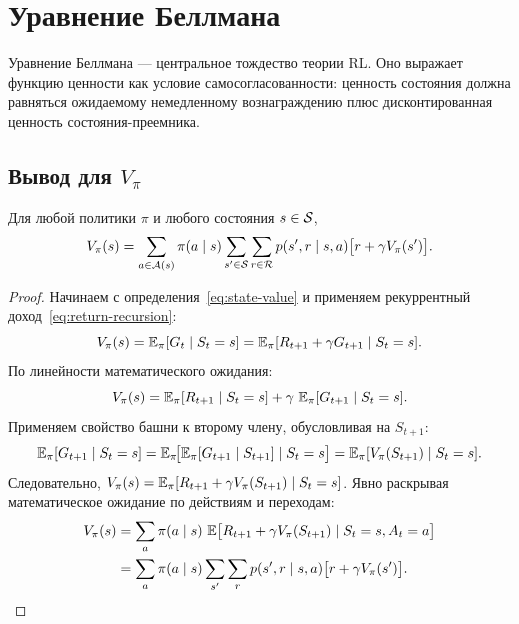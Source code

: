 \section{Уравнение Беллмана}
\label{sec:bellman-equation}

Уравнение Беллмана — центральное тождество теории RL. Оно выражает функцию ценности как условие самосогласованности: ценность состояния должна равняться ожидаемому немедленному вознаграждению плюс дисконтированная ценность состояния-преемника.

\subsection*{Вывод для $V_\pi$}

\begin{theorem}
\label{thm:bellman-v}
Для любой политики $\pi$ и любого состояния $s \in \mathcal{S}$,
\begin{equation}
\label{eq:bellman-v}
V_\pi(s)
= \sum_{a \in \mathcal{A}(s)} \pi(a \mid s)
  \sum_{s' \in \mathcal{S}} \sum_{r \in \mathcal{R}}
  p(s', r \mid s, a)\bigl[r + \gamma V_\pi(s')\bigr].
\end{equation}
\end{theorem}

\begin{proof}
Начинаем с определения~\eqref{eq:state-value} и применяем рекуррентный доход~\eqref{eq:return-recursion}:
\[
V_\pi(s)
= \operatorname{\mathbb{E}}_\pi[G_t \mid S_t = s]
= \operatorname{\mathbb{E}}_\pi[R_{t+1} + \gamma G_{t+1} \mid S_t = s].
\]
По линейности математического ожидания:
\[
V_\pi(s) = \operatorname{\mathbb{E}}_\pi[R_{t+1} \mid S_t = s]
           + \gamma\, \operatorname{\mathbb{E}}_\pi[G_{t+1} \mid S_t = s].
\]
Применяем свойство башни к второму члену, обусловливая на $S_{t+1}$:
\[
\operatorname{\mathbb{E}}_\pi[G_{t+1} \mid S_t = s]
= \operatorname{\mathbb{E}}_\pi\!\bigl[\operatorname{\mathbb{E}}_\pi[G_{t+1} \mid S_{t+1}] \mid S_t = s\bigr]
= \operatorname{\mathbb{E}}_\pi[V_\pi(S_{t+1}) \mid S_t = s].
\]
Следовательно, $V_\pi(s) = \operatorname{\mathbb{E}}_\pi[R_{t+1} + \gamma V_\pi(S_{t+1}) \mid S_t = s]$.  Явно раскрывая математическое ожидание по действиям и переходам:
\begin{align*}
V_\pi(s)
&= \sum_{a} \pi(a \mid s)\,
   \operatorname{\mathbb{E}}\bigl[R_{t+1} + \gamma V_\pi(S_{t+1}) \mid S_t = s, A_t = a\bigr] \\
&= \sum_{a} \pi(a \mid s)
   \sum_{s'} \sum_{r} p(s', r \mid s, a)\bigl[r + \gamma V_\pi(s')\bigr]. \qedhere
\end{align*}
\end{proof}

